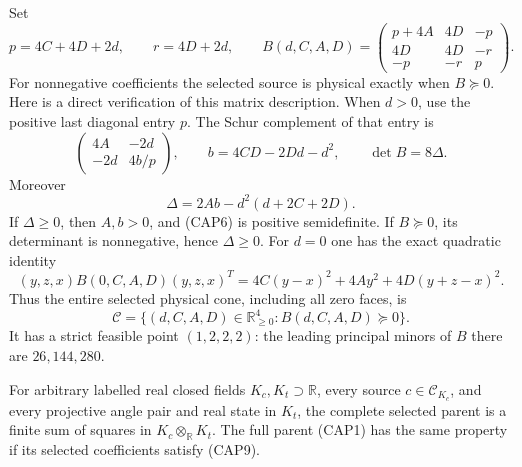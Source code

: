 Set
\[
p=4C+4D+2d,\qquad r=4D+2d,\qquad
B(d,C,A,D)=
\begin{pmatrix}
p+4A&4D&-p\\
4D&4D&-r\\
-p&-r&p
\end{pmatrix}.
\tag{CAP5}
\]
For nonnegative coefficients the selected source is physical exactly
when $B\succeq0$.  Here is a direct verification of this matrix
description.  When $d>0$, use the positive last diagonal entry $p$.
The Schur complement of that entry is
\[
\begin{pmatrix}4A&-2d\\-2d&4b/p\end{pmatrix},
\qquad b=4CD-2Dd-d^2,
\qquad \det B=8\Delta.
\tag{CAP6}
\]
Moreover
\[
\Delta=2Ab-d^2(d+2C+2D).
\tag{CAP7}
\]
If $\Delta\geq0$, then $A,b>0$, and (CAP6) is positive semidefinite.
If $B\succeq0$, its determinant is nonnegative, hence $\Delta\geq0$.
For $d=0$ one has the exact quadratic identity
\[
(y,z,x)B(0,C,A,D)(y,z,x)^T
 =4C(y-x)^2+4Ay^2+4D(y+z-x)^2.
\tag{CAP8}
\]
Thus the entire selected physical cone, including all zero faces, is
\[
\mathcal C=\{(d,C,A,D)\in\mathbb R_{\geq0}^4:B(d,C,A,D)\succeq0\}.
\tag{CAP9}
\]
It has a strict feasible point $(1,2,2,2)$: the leading principal
minors of $B$ there are $26,144,280$.

\begin{lemma}
For arbitrary labelled real closed fields $K_c,K_t\supset\mathbb R$,
every source $c\in\mathcal C_{K_c}$, and every projective angle pair
and real state in $K_t$, the complete selected parent is a finite sum
of squares in $K_c\otimes_{\mathbb R}K_t$.  The full parent (CAP1)
has the same property if its selected coefficients satisfy (CAP9).
\end{lemma}

